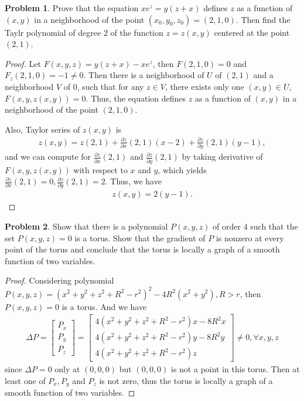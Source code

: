 \documentclass[11pt]{article}
\theoremstyle{definition}
\newtheorem{problem}{Problem}
\theoremstyle{definition}
\begin{document}
\begin{problem}
Prove that the equation $xe^z=y(z+x)$ defines $z$ as a function of $(x,y)$ in a neighborhood of the point
$(x_0,y_0,z_0)=(2,1,0)$. Then find the Taylr polynomial
of degree $2$ of the function $z=z(x,y)$ centered at the point
$(2,1)$.
\end{problem}
\begin{proof}
Let $F(x,y,z) = y(z+x) - x e^z$, then $F(2,1,0) = 0$ and $F_z(2,1,0) = -1 \neq 0$. Then there is a neighborhood of $U$ of $(2,1)$ and a neighborhood $V$ of $0$, such that for any $z\in V$, there exists only one $(x,y) \in U$, $F(x,y,z(x,y)) = 0$. Thus, the equation defines $z$ as a function of $(x,y)$ in a neighborhood of the point
$(2,1,0)$. 

Also, Taylor series of $z(x,y)$ is 
\begin{align*}
    z(x,y) = z(2,1) + \frac{\partial z}{\partial x}(2,1) (x-2) + \frac{\partial z}{\partial y}(2,1) (y-1),
\end{align*}
and we can compute for $\frac{\partial z}{\partial x}(2,1)$ and $\frac{\partial z}{\partial y}(2,1)$ by taking derivative of $F(x,y,z(x,y))$ with respect to $x$ and $y$, which yields $\frac{\partial z}{\partial x}(2,1) = 0, \frac{\partial z}{\partial y}(2,1) = 2$. Thus, we have 
\begin{align*}
    z(x,y) = 2 (y-1).
\end{align*}
\end{proof}

\medskip

\begin{problem}
Show that there is a polynomial $P(x,y,z)$ of order $4$ such that the set $P(x,y,z)=0$ is a torus. Show that the gradient of $P$ is nonzero at every point of the torus and conclude that the torus is locally a graph of a smooth function of two variables.
\end{problem}
\begin{proof}
Considering polynomial $P(x,y,z) = (x^2 + y^2 + z^2 + R^2 - r^2)^2 - 4R^2(x^2 + y^2), R > r$, then $P(x,y,z) = 0$ is a torus. And we have 
\begin{align*}
    \Delta P = \begin{bmatrix}
        P_x \\
        P_y \\
        P_z
    \end{bmatrix} = \begin{bmatrix}
        4 (x^2 + y^2 + z^2 + R^2 - r^2)x - 8 R^2 x\\
        4 (x^2 + y^2 + z^2 + R^2 - r^2)y - 8 R^2 y \\
        4 (x^2 + y^2 + z^2 + R^2 - r^2)z
    \end{bmatrix}
    \neq 0, \forall x,y,z
\end{align*}
since $\Delta P = 0$ only at $(0,0,0)$ but $(0,0,0)$ is not a point in this torus. Then at least one of $P_x, P_y$ and $P_z$ is not zero, thus the torus is locally a graph of a smooth function of two variables.
\end{proof}
\end{document}
